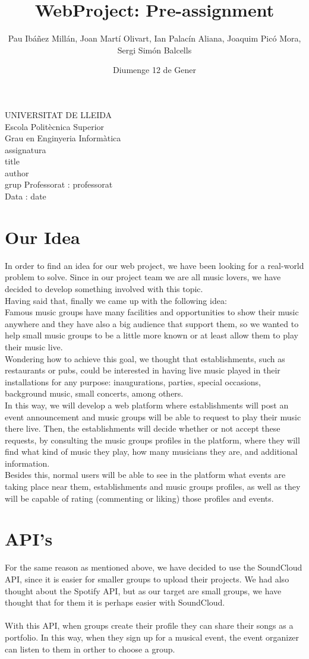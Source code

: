 \documentclass{article}
\title{WebProject: Pre-assignment}
\author{Pau Ibáñez Millán, Joan Martí Olivart, Ian Palacín Aliana, Joaquim Picó Mora, Sergi Simón Balcells}
\date{Diumenge 12 de Gener}
\renewcommand{\maketitle}{ %
    \begin{titlepage}
        \raggedright{UNIVERSITAT DE LLEIDA \\
            Escola Politècnica Superior \\
            Grau en Enginyeria Informàtica\\
            \1assignatura\\}
            \vspace{5cm}
            \centering\huge{\5title \\}
            \vspace{3cm}
            \large{\6author} \\
            \normalsize{\3grup}
            \vfill
            Professorat : \4professorat \\
            Data : \7date
\end{titlepage}}
\begin{document}
    \maketitle
    \thispagestyle{empty}
    
    \newpage
    \tableofcontents
    \newpage
    
\section{Our Idea}
In order to find an idea for our web project, we have been looking for a real-world problem to solve. Since in our project team we are all music lovers, we have decided to develop something involved with this topic. \\
Having said that, finally we came up with the following idea: \\
Famous music groups have many facilities and opportunities to show their music anywhere and they have also a big audience that support them, so we wanted to help small music groups to be a little more known or at least allow them to play their music live. \\
Wondering how to achieve this goal, we thought that establishments, such as restaurants or pubs, could be interested in having live music played in their installations for any purpose: inaugurations, parties, special occasions, background music, small concerts, among others. \\
In this way, we will develop a web platform where establishments will post an event announcement and music groups will be able to request to play their music there live. Then, the establishments will decide whether or not accept these requests, by consulting the music groups profiles in the platform, where they will find what kind of music they play, how many musicians they are, and additional information. \\
Besides this, normal users will be able to see in the platform what events are taking place near them, establishments and music groups profiles, as well as they will be capable of rating (commenting or liking) those profiles and events. \\

\section{API's}
For the same reason as mentioned above, we have decided to use the SoundCloud API, since it is easier for smaller groups to upload their projects. We had also thought about the Spotify API, but as our target are small groups, we have thought that for them it is perhaps easier with SoundCloud.
\\\\
With this API, when groups create their profile they can share their songs as a portfolio. In this way, when they sign up for a musical event, the event organizer can listen to them in orther to choose a group.
\newpage
\end{document}

